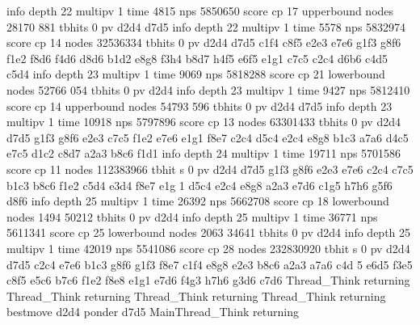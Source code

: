 info depth 22 multipv 1 time 4815 nps 5850650 score cp 17 upperbound nodes 28170
881 tbhits 0 pv d2d4 d7d5
info depth 22 multipv 1 time 5578 nps 5832974 score cp 14 nodes 32536334 tbhits
0 pv d2d4 d7d5 c1f4 c8f5 e2e3 e7e6 g1f3 g8f6 f1e2 f8d6 f4d6 d8d6 b1d2 e8g8 f3h4
b8d7 h4f5 e6f5 e1g1 c7c5 c2c4 d6b6 c4d5 c5d4
info depth 23 multipv 1 time 9069 nps 5818288 score cp 21 lowerbound nodes 52766
054 tbhits 0 pv d2d4
info depth 23 multipv 1 time 9427 nps 5812410 score cp 14 upperbound nodes 54793
596 tbhits 0 pv d2d4 d7d5
info depth 23 multipv 1 time 10918 nps 5797896 score cp 13 nodes 63301433 tbhits
 0 pv d2d4 d7d5 g1f3 g8f6 e2e3 c7c5 f1e2 e7e6 e1g1 f8e7 c2c4 d5c4 e2c4 e8g8 b1c3
 a7a6 d4c5 e7c5 d1c2 c8d7 a2a3 b8c6 f1d1
info depth 24 multipv 1 time 19711 nps 5701586 score cp 11 nodes 112383966 tbhit
s 0 pv d2d4 d7d5 g1f3 g8f6 e2e3 e7e6 c2c4 c7c5 b1c3 b8c6 f1e2 c5d4 e3d4 f8e7 e1g
1 d5c4 e2c4 e8g8 a2a3 e7d6 c1g5 h7h6 g5f6 d8f6
info depth 25 multipv 1 time 26392 nps 5662708 score cp 18 lowerbound nodes 1494
50212 tbhits 0 pv d2d4
info depth 25 multipv 1 time 36771 nps 5611341 score cp 25 lowerbound nodes 2063
34641 tbhits 0 pv d2d4
info depth 25 multipv 1 time 42019 nps 5541086 score cp 28 nodes 232830920 tbhit
s 0 pv d2d4 d7d5 c2c4 e7e6 b1c3 g8f6 g1f3 f8e7 c1f4 e8g8 e2e3 b8c6 a2a3 a7a6 c4d
5 e6d5 f3e5 c8f5 e5c6 b7c6 f1e2 f8e8 e1g1 e7d6 f4g3 h7h6 g3d6 c7d6
Thread_Think returning
Thread_Think returning
Thread_Think returning
Thread_Think returning
bestmove d2d4 ponder d7d5
MainThread_Think returning


